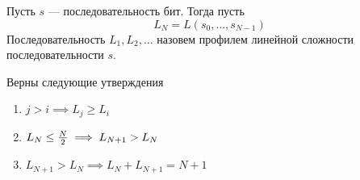 \begin{definition}
Пусть $s$ --- последовательность бит. Тогда пусть $$L_N = L(s_0, \ldots, s_{N-1})$$
Последовательность $L_1, L_2, \ldots$ назовем профилем линейной сложности
последовательности $s$.
\end{definition}


\begin{proposition}
Верны следующие утверждения
\begin{enumerate}
\item $j > i \implies L_j \ge L_i$
\item $L_N \le {N \over 2} \implies L_{N+1} > L_N$
\item $L_{N+1} > L_N \implies L_{N} + L_{N+1} = N+1$
\end{enumerate}
\end{proposition}
